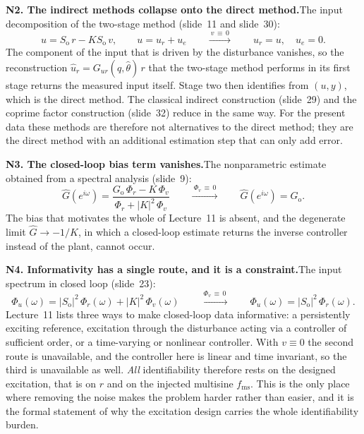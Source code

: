 \documentclass[11pt]{article}
\begin{document}
\medskip\noindent\textbf{N2. The indirect methods collapse onto the direct method.}\quad The input
decomposition of the two-stage method (slide~11 and slide~30):
\begin{equation}
  u = S_{\mathrm{o}}\,r - K S_{\mathrm{o}}\,v ,
  \qquad u = u_r + u_e
  \qquad\xrightarrow{\ v\,\equiv\,0\ }\qquad
  u_r = u , \quad u_e = 0 .
  \label{eq:n2}
\end{equation}
The component of the input that is driven by the disturbance vanishes, so the reconstruction
$\hat u_r = G_{ur}(q,\hat\theta)\,r$ that the two-stage method performs in its first stage returns
the measured input itself. Stage two then identifies from $(u, y)$, which is the direct method.
The classical indirect construction (slide~29) and the coprime factor construction (slide~32)
reduce in the same way. For the present data these methods are therefore not alternatives to the
direct method; they are the direct method with an additional estimation step that can only add
error.

\medskip\noindent\textbf{N3. The closed-loop bias term vanishes.}\quad The nonparametric estimate
obtained from a spectral analysis (slide~9):
\begin{equation}
  \hat G(e^{i\omega}) =
  \frac{G_{\mathrm{o}}\,\Phi_r - K\,\Phi_v}{\Phi_r + |K|^2\,\Phi_v}
  \qquad\xrightarrow{\ \Phi_v\,\equiv\,0\ }\qquad
  \hat G(e^{i\omega}) = G_{\mathrm{o}} .
  \label{eq:n3}
\end{equation}
The bias that motivates the whole of Lecture~11 is absent, and the degenerate limit
$\hat G \to -1/K$, in which a closed-loop estimate returns the inverse controller instead of the
plant, cannot occur.

\medskip\noindent\textbf{N4. Informativity has a single route, and it is a constraint.}\quad The
input spectrum in closed loop (slide~23):
\begin{equation}
  \Phi_u(\omega) = |S_{\mathrm{o}}|^2\,\Phi_r(\omega) + |K|^2\,\Phi_v(\omega)
  \qquad\xrightarrow{\ \Phi_v\,\equiv\,0\ }\qquad
  \Phi_u(\omega) = |S_{\mathrm{o}}|^2\,\Phi_r(\omega) .
  \label{eq:n4}
\end{equation}
Lecture~11 lists three ways to make closed-loop data informative: a persistently exciting
reference, excitation through the disturbance acting via a controller of sufficient order, or a
time-varying or nonlinear controller. With $v \equiv 0$ the second route is unavailable, and the
controller here is linear and time invariant, so the third is unavailable as well. \emph{All}
identifiability therefore rests on the designed excitation, that is on $r$ and on the injected
multisine $f_{\mathrm{ms}}$. This is the only place where removing the noise makes the problem
harder rather than easier, and it is the formal statement of why the excitation design carries the
whole identifiability burden.
\end{document}
